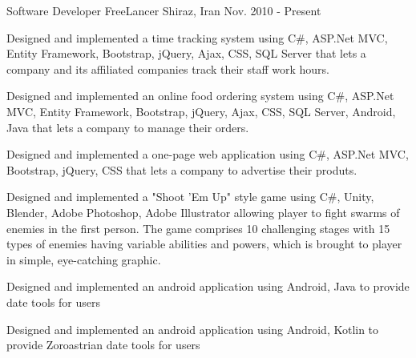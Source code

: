 


\begin{cventries}


\cventry
{Software Developer} %
{FreeLancer} %
{Shiraz, Iran} %
{Nov. 2010 - Present} %
{ %
\begin{cvitems}
\item {Designed and implemented a time tracking system using C\#, ASP.Net MVC, Entity Framework, Bootstrap, jQuery, Ajax, CSS, SQL Server that lets a company and its affiliated companies track their staff work hours.}
\item {Designed and implemented an online food ordering system using C\#, ASP.Net MVC, Entity Framework, Bootstrap, jQuery, Ajax, CSS, SQL Server, Android, Java that lets a company to manage their orders.}
\item {Designed and implemented a one-page web application using C\#, ASP.Net MVC, Bootstrap, jQuery, CSS that lets a company to advertise their produts.}
\item {Designed and implemented a "Shoot 'Em Up" style game using C\#, Unity, Blender, Adobe Photoshop, Adobe Illustrator allowing player to fight swarms of enemies in the first person. The game comprises 10 challenging stages with 15 types of enemies having variable abilities and powers, which is brought to player in simple, eye-catching graphic.}
\item {Designed and implemented an android application using Android, Java to provide date tools for users}
\item {Designed and implemented an android application using Android, Kotlin to provide Zoroastrian date tools for users}
\end{cvitems}
}


\end{cventries}